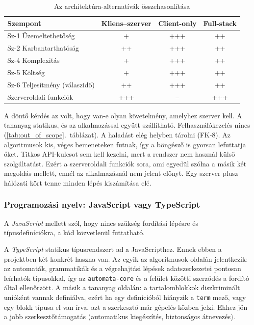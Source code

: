 \begin{table}[H]
    \centering
    \begin{tabularx}{\textwidth}{|X|c|c|c|}
        \hline
        \textbf{Szempont} & \textbf{Kliens--szerver} & \textbf{Client-only} & \textbf{Full-stack} \\ \hline
        Sz-1 Üzemeltethetőség        & +   & +++ & ++  \\ \hline
        Sz-2 Karbantarthatóság       & ++  & +++ & ++  \\ \hline
        Sz-4 Komplexitás             & +   & +++ & ++  \\ \hline
        Sz-5 Költség                 & +   & +++ & ++  \\ \hline
        Sz-6 Teljesítmény (válaszidő) & ++  & +++ & ++  \\ \hline
        Szerveroldali funkciók       & +++ & --  & +++ \\ \hline
    \end{tabularx}
    \caption{Az architektúra-alternatívák összehasonlítása}
    \label{tab:arch-matrix}
\end{table}

A döntő kérdés az volt, hogy van-e olyan követelmény, amelyhez
szerver kell. A tananyag statikus, és az alkalmazással együtt
szállítható. Felhasználókezelés nincs (\ref{tab:out_of_scope}.~táblázat).
A haladást elég helyben tárolni (FK-8). Az algoritmusok kis, véges
bemeneteken futnak, így a böngésző is gyorsan lefuttatja őket. Titkos
API-kulcsot sem kell kezelni, mert a rendszer nem használ külső
szolgáltatást. Ezért a szerveroldali funkciók sora, ami egyedül szólna
a másik két megoldás mellett, ennél az alkalmazásnál nem jelent előnyt.
Egy szerver plusz hálózati kört tenne minden lépés
kiszámítása elé.

\subsubsection{Programozási nyelv: JavaScript vagy TypeScript}

A \emph{JavaScript} mellett szól, hogy nincs szükség fordítási
lépésre és típusdefiníciókra, a kód közvetlenül futtatható. 

A \emph{TypeScript} statikus típusrendszert ad a JavaScripthez. Ennek
ebben a projektben két konkrét haszna van. Az egyik az algoritmusok
oldalán jelentkezik: az automaták, grammatikák és a végrehajtási
lépések adatszerkezetei pontosan leírhatók típusokkal, így az
\texttt{automata-core} és a felület közötti szerződés a fordító által
ellenőrzött. A másik a tananyag oldalán: a tartalomblokkok
diszkriminált unióként vannak definiálva, ezért ha egy definícióból
hiányzik a \texttt{term} mező, vagy egy blokk típusa el van írva, azt
a szerkesztő már gépelés közben jelzi. Ehhez jön a jobb szerkesztőtámogatás
(automatikus kiegészítés, biztonságos átnevezés).


